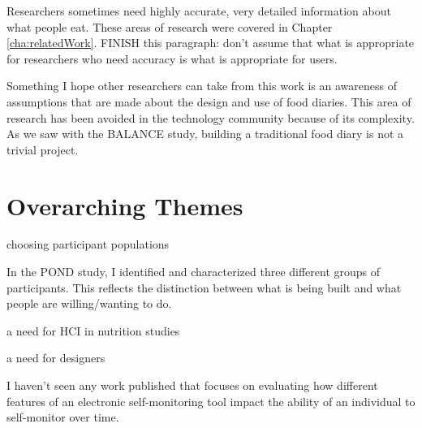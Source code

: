 Researchers sometimes need highly accurate, very detailed information about what people eat. These areas of research were covered in Chapter \ref{cha:relatedWork}. FINISH this paragraph: don't assume that what is appropriate for researchers who need accuracy is what is appropriate for users. 

Something I hope other researchers can take from this work is an awareness of assumptions that are made about the design and use of food diaries. This area of research has been avoided in the technology community because of its complexity. As we saw with the BALANCE study, building a traditional food diary is not a trivial project. 

\section{Overarching Themes}
\begin{itemize*}
\item choosing participant populations
\item In the POND study, I identified and characterized three different groups of participants. This reflects the distinction between what is being built and what people are willing/wanting to do. 
\item a need for HCI in nutrition studies
\item a need for designers 
\item I haven't seen any work published that focuses on evaluating how different features of an electronic self-monitoring tool impact the ability of an individual to self-monitor over time. 
\end{itemize*}


